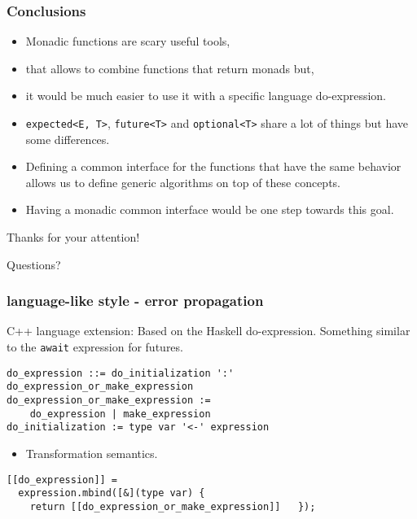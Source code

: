 \documentclass[xcolor=dvipsnames]{beamer}
\newcommand{\cpp}[1]{\lstinline{#1}}
\begin{document}
\begin{frame}
\frametitle{Conclusions}
\begin{itemize}
  \item Monadic functions are scary useful tools, 
  \item that allows to combine functions that return monads but,
  \item it would be much easier to use it with a specific language do-expression.
\end{itemize}

\begin{itemize}
  \item \cpp{expected<E, T>}, \cpp{future<T>} and \cpp{optional<T>} share a lot of things but have some differences.
  \item Defining a common interface for the functions that have the same behavior allows us to define generic algorithms on top of these concepts.
  \item Having a monadic common interface would be one step towards this goal.
\end{itemize}

\end{frame}

\begin{frame}
\begin{center}
\Large{Thanks for your attention!}
\end{center}
\begin{center}
\Large{Questions?}
\end{center}
\end{frame}





\begin{frame}[fragile]
\frametitle{language-like style  - error propagation}
C++ language extension: Based on the Haskell do-expression. Something similar to the \cpp{await} expression for futures.  

\begin{lstlisting}
do_expression ::= do_initialization ':' do_expression_or_make_expression
do_expression_or_make_expression := 
    do_expression | make_expression
do_initialization := type var '<-' expression
\end{lstlisting}

\begin{itemize}
  \item Transformation semantics.
\end{itemize}

\begin{lstlisting}
[[do_expression]] =
  expression.mbind([&](type var) {
    return [[do_expression_or_make_expression]]   });
    
\end{lstlisting}

\end{frame}
\end{document}
